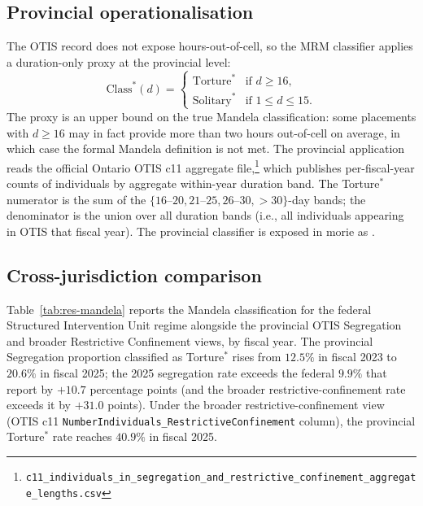 \documentclass[article,shortnames,nojss]{jss}
\newcommand{\OTIS}{\textsf{OTIS}}
\begin{document}
\subsection{Provincial operationalisation}
\label{sec:mandela-provincial}

The \OTIS{} record does not expose hours-out-of-cell, so the MRM
classifier applies a duration-only proxy at the provincial level:
\begin{equation}
\label{eq:provincial-mandela}
  \mathrm{Class}^{\ast}(d) = \begin{cases}
    \mathrm{Torture}^{\ast}  & \text{if } d \ge 16, \\
    \mathrm{Solitary}^{\ast} & \text{if } 1 \le d \le 15.
  \end{cases}
\end{equation}
The proxy is an upper bound on the true Mandela classification: some
placements with $d \ge 16$ may in fact provide more than two hours
out-of-cell on average, in which case the formal Mandela definition
is not met. The provincial application reads the official Ontario
\OTIS{} c11 aggregate file,\footnote{\texttt{c11\_individuals\_in\_segregation\_and\_restrictive\_confinement\_aggregate\_lengths.csv}}
which publishes per-fiscal-year counts of individuals by aggregate
within-year duration band. The Torture$^{\ast}$ numerator is the
sum of the $\{16\text{--}20, 21\text{--}25, 26\text{--}30,
>30\}$-day bands; the denominator is the union over all duration
bands (i.e., all individuals appearing in \OTIS{} that fiscal year).
The provincial classifier is exposed in morie as
.

\subsection{Cross-jurisdiction comparison}
\label{sec:mandela-cross-jurisdiction}

Table~\ref{tab:res-mandela} reports the Mandela classification for the
federal Structured Intervention Unit regime \citep{SprottDoob2021}
alongside the provincial \OTIS{} Segregation and broader Restrictive
Confinement views, by fiscal year. The provincial Segregation
proportion classified as Torture$^{\ast}$ rises from $12.5\%$ in
fiscal 2023 to $20.6\%$ in fiscal 2025; the 2025 segregation rate
exceeds the federal $9.9\%$ that \citet{SprottDoob2021} report by
$+10.7$ percentage points (and the broader restrictive-confinement
rate exceeds it by $+31.0$ points). Under the broader
restrictive-confinement view (\OTIS{} c11
\texttt{NumberIndividuals\_RestrictiveConfinement} column), the
provincial Torture$^{\ast}$ rate reaches $40.9\%$ in fiscal 2025.
\end{document}
